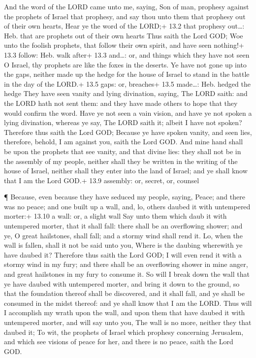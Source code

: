  And the word of the LORD came unto me, saying, 
Son of man, prophesy against the prophets of Israel that prophesy, and
say thou unto them that prophesy out of their own hearts, Hear ye the
word of the LORD;+ 13.2 that prophesy out\ldots: Heb. that are prophets
out of their own hearts  Thus saith the Lord GOD; Woe unto
the foolish prophets, that follow their own spirit, and have seen
nothing!+ 13.3 follow: Heb. walk after+ 13.3 and\ldots: or, and things
which they have not seen  O Israel, thy prophets are like
the foxes in the deserts.  Ye have not gone up into the
gaps, neither made up the hedge for the house of Israel to stand in the
battle in the day of the LORD.+ 13.5 gaps: or, breaches+ 13.5
made\ldots: Heb. hedged the hedge  They have seen vanity and
lying divination, saying, The LORD saith: and the LORD hath not sent
them: and they have made others to hope that they would confirm the
word.  Have ye not seen a vain vision, and have ye not
spoken a lying divination, whereas ye say, The LORD saith it; albeit I
have not spoken?  Therefore thus saith the Lord GOD; Because
ye have spoken vanity, and seen lies, therefore, behold, I am against
you, saith the Lord GOD.  And mine hand shall be upon the
prophets that see vanity, and that divine lies: they shall not be in the
assembly of my people, neither shall they be written in the writing of
the house of Israel, neither shall they enter into the land of Israel;
and ye shall know that I am the Lord GOD.+ 13.9 assembly: or, secret,
or, counsel

 ¶ Because, even because they have seduced my people,
saying, Peace; and there was no peace; and one built up a wall, and, lo,
others daubed it with untempered morter:+ 13.10 a wall: or, a slight
wall  Say unto them which daub it with untempered morter,
that it shall fall: there shall be an overflowing shower; and ye, O
great hailstones, shall fall; and a stormy wind shall rend it.
 Lo, when the wall is fallen, shall it not be said unto
you, Where is the daubing wherewith ye have daubed it? 
Therefore thus saith the Lord GOD; I will even rend it with a stormy
wind in my fury; and there shall be an overflowing shower in mine anger,
and great hailstones in my fury to consume it.  So will I
break down the wall that ye have daubed with untempered morter, and
bring it down to the ground, so that the foundation thereof shall be
discovered, and it shall fall, and ye shall be consumed in the midst
thereof: and ye shall know that I am the LORD.  Thus will I
accomplish my wrath upon the wall, and upon them that have daubed it
with untempered morter, and will say unto you, The wall is no more,
neither they that daubed it;  To wit, the prophets of
Israel which prophesy concerning Jerusalem, and which see visions of
peace for her, and there is no peace, saith the Lord GOD.

